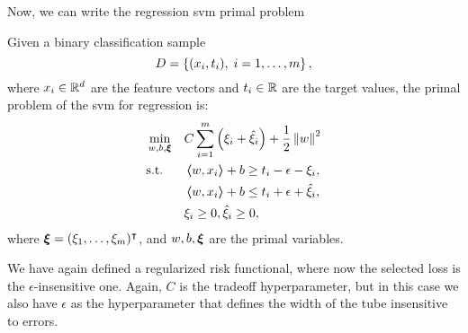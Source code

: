 Now, we can write the regression \acrshort{svm} primal problem
\begin{definition}
    Given a binary classification sample
    $$ D = \left\{(x_i, t_i), \; i=1, \ldots, m\right\} ,$$
    where $x_i \in \mathbb{R}^d$ are the feature vectors and $t_i \in \mathbb{R}$ are the target values, 
    the primal problem of the \acrshort{svm} for regression is:
    \begin{equation}
        \label{eq:linear_primal_reg}
        \begin{aligned}
            &\min_{w, b, \fv{\xi}} & & C \sum_{i=1}^m \left(\xi_i + \hat{\xi}_i\right) + \frac{1}{2} \norm{w}^2 \\
            & \text{s.t.} & & \dotp{w}{x_i} + b \geq t_i - \epsilon - \xi_i  , \\
            & & & \dotp{w}{x_i} + b \leq t_i + \epsilon + \hat{\xi}_i , \\
            & & & \xi_i \geq 0 , \hat{\xi}_i \geq 0 ,      
        \end{aligned}  
    \end{equation}
    where $\bm{\xi} = (\xi_1, \ldots, \xi_m)^\intercal$, and $w, b, \bm{\xi}$ are the primal variables.
\end{definition}
We have again defined a regularized risk functional, where now the selected loss is the $\epsilon$-insensitive one. Again, $C$ is the tradeoff hyperparameter, but in this case we also have $\epsilon$ as the hyperparameter that defines the width of the tube insensitive to errors.

